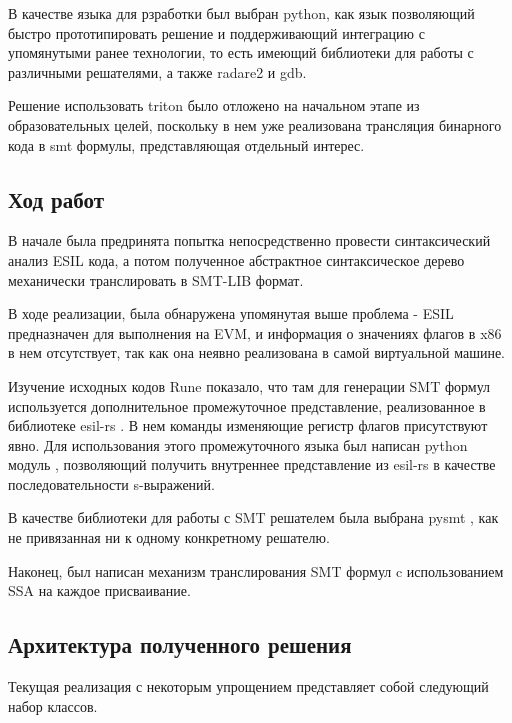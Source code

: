 В качестве языка для рзработки был выбран python, как язык позволяющий быстро прототипировать решение и поддерживающий интеграцию с упомянутыми ранее технологии, то есть имеющий библиотеки для работы с различными решателями, а также radare2 и gdb.

Решение использовать triton было отложено на начальном этапе из образовательных целей, поскольку в нем уже реализована трансляция бинарного кода в smt формулы, представляющая отдельный интерес.


\subsection{Ход работ}

В начале была предринята попытка непосредственно провести синтаксический анализ ESIL кода, а потом полученное абстрактное синтаксическое дерево механически транслировать в SMT-LIB формат.

В ходе реализации, была обнаружена упомянутая выше проблема - ESIL предназначен для выполнения на EVM, и информация о значениях флагов в x86 в нем отсутствует, так как она неявно реализована в самой виртуальной машине.

\bigskip
Изучение исходных кодов Rune показало, что там для генерации SMT формул используется дополнительное промежуточное представление, реализованное в библиотеке esil-rs \cite{esil-rs}.
В нем команды изменяющие регистр флагов присутствуют явно.
Для использования этого промежуточного языка был написан python модуль \cite{pyesil}, позволяющий получить внутреннее представление из esil-rs в качестве последовательности s-выражений.


\bigskip

В качестве библиотеки для работы с SMT решателем была выбрана pysmt \cite{pysmt}, как не привязанная ни к одному конкретному решателю.

Наконец, был написан механизм транслирования SMT формул c использованием SSA на каждое присваивание.


\subsection{Архитектура полученного решения}

Текущая реализация с некоторым упрощением представляет собой следующий набор классов. 

